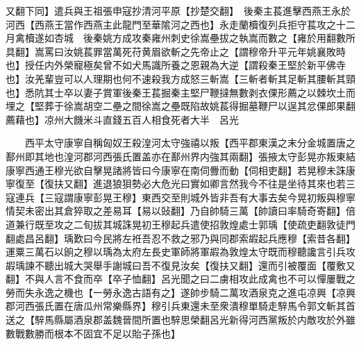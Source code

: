 又翻下同】遣兵與王祖張申寇抄清河平原【抄楚交翻】　後秦主萇進擊西燕王永於河西【西燕王當作西燕主此龍門至華隂河之西也】永走蘭櫝復列兵拒守萇攻之十二月禽櫝遂如杏城　後秦姚方成攻秦雍州刺史徐嵩壘拔之執嵩而數之【雍於用翻數所具翻】嵩罵曰汝姚萇罪當萬死苻黄眉欲斬之先帝止之【謂穆帝升平元年姚襄敗時也】授任内外榮寵極矣曾不如犬馬識所養之恩親為大逆【謂殺秦王堅於新平佛寺也】汝羌輩豈可以人理期也何不速殺我方成怒三斬嵩【三斬者斬其足斬其腰斬其頸也】悉阬其士卒以妻子賞軍後秦王萇掘秦主堅尸鞭撻無數剥衣倮形薦之以棘坎土而埋之【堅葬于徐嵩胡空二壘之間徐嵩之壘既陷故姚萇得掘墓鞭尸以逞其忿倮郎果翻薦藉也】凉州大饑米斗直錢五百人相食死者大半　呂光

　　西平太守康寧自稱匈奴王殺湟河太守強禧以叛【西平郡東漢之末分金城置唐之鄯州即其地也湟河郡河西張氏置盖亦在鄯州界内強其兩翻】張掖太守彭晃亦叛東結康寧西通王穆光欲自擊晃諸將皆曰今康寧在南伺釁而動【伺相吏翻】若晃穆未誅康寧復至【復扶又翻】進退狼狽勢必大危光曰實如卿言然我今不往是坐待其來也若三寇連兵【三寇謂康寧彭晃王穆】東西交至則城外皆非吾有大事去矣今晃初叛與穆寧情契未密出其倉猝取之差易耳【易以䜴翻】乃自帥騎三萬【帥讀曰率騎奇寄翻】倍道兼行既至攻之二旬拔其城誅晃初王穆起兵遣使招敦煌處士郭瑀【使疏吏翻敦徒門翻處昌呂翻】瑀歎曰今民將左袵吾忍不救之邪乃與同郡索嘏起兵應穆【索昔各翻】運粟三萬石以餉之穆以瑀為太府左長史軍師將軍嘏為敦煌太守既而穆聽讒言引兵攻嘏瑀諫不聽出城大哭舉手謝城曰吾不復見汝矣【復扶又翻】還而引被覆面【覆敷又翻】不與人言不食而卒【卒子恤翻】呂光聞之曰二虜相攻此成禽也不可以憚屢戰之勞而失永逸之機也【一勞永逸古語有之】遂帥步騎二萬攻酒泉克之進屯凉興【凉興郡河西張氏置在唐瓜州常樂縣界】穆引兵東還未至衆潰穆單騎走騂馬令郭文斬其首送之【騂馬縣屬酒泉郡盖魏晉間所置也騂思榮翻呂光新得河西黨叛於内敵攻於外雖數戰數勝而根本不固宜不足以貽子孫也】

